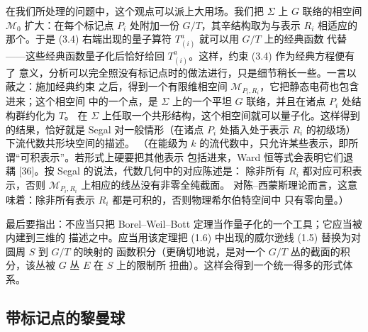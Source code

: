 \documentclass[11pt,a4paper]{article}
\begin{document}

在我们所处理的问题中，这个观点可以派上大用场。我们把 $\Sigma$ 上 $G$ 联络的相空间
$\mathcal{M}_0$ 扩大：在每个标记点 $P_i$ 处附加一份 $G/T$，其辛结构取为与表示 $R_i$
相适应的那个。于是 (3.4) 右端出现的量子算符 $T^{a}_{(i)}$ 就可以用 $G/T$ 上的经典函数
代替——这些经典函数量子化后恰好给回 $T^{a}_{(i)}$。这样，约束 (3.4) 作为经典方程便有了
意义，分析可以完全照没有标记点时的做法进行，只是细节稍长一些。一言以蔽之：施加经典约束
之后，得到一个有限维相空间 $\mathcal{M}_{P_i,R_i}$，它把静态电荷也包含进来；这个相空间
中的一个点，是 $\Sigma$ 上的一个平坦 $G$ 联络，并且在诸点 $P_i$ 处结构群约化为 $T$。
在 $\Sigma$ 上任取一个共形结构，这个相空间就可以量子化。这样得到的结果，恰好就是 Segal
对一般情形（在诸点 $P_i$ 处插入处于表示 $R_i$ 的初级场）下流代数共形块空间的描述。
（在能级为 $k$ 的流代数中，只允许某些表示，即所谓“可积表示”。若形式上硬要把其他表示
包括进来，Ward 恒等式会表明它们退耦 [36]。按 Segal 的说法，代数几何中的对应陈述是：
除非所有 $R_i$ 都对应可积表示，否则 $\mathcal{M}_{P_i,R_i}$ 上相应的线丛没有非零全纯截面。
对陈–西蒙斯理论而言，这意味着：除非所有表示 $R_i$ 都是可积的，否则物理希尔伯特空间中
只有零向量。）

最后要指出：不应当只把 Borel–Weil–Bott 定理当作量子化的一个工具；它应当被内建到三维的
描述之中。应当用该定理把 (1.6) 中出现的威尔逊线 (1.5) 替换为对圆周 $S$ 到 $G/T$ 的映射的
函数积分（更确切地说，是对一个 $G/T$ 丛的截面的积分，该丛被 $G$ 丛 $E$ 在 $S$ 上的限制所
扭曲）。这样会得到一个统一得多的形式体系。


\subsection{带标记点的黎曼球}
\end{document}
